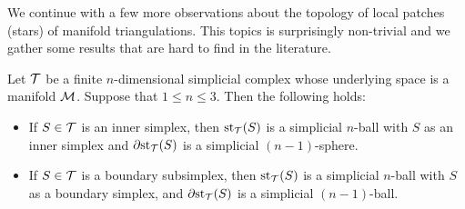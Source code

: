 \documentclass[10pt,a4paper]{article}
\begin{document}
We continue with a few more observations about the topology of local patches (stars) of manifold triangulations. This topics is surprisingly non-trivial and 
we gather some results that are hard to find in the literature. 

\begin{lemma}\label{lemma:startopology}
    Let ${\mathcal T}$ be a finite $n$-dimensional simplicial complex whose underlying space is a manifold ${\mathcal M}$.
    Suppose that $1 \leq n \leq 3$. Then the following holds:
    \begin{itemize}
        \item
        If $S \in {\mathcal T}$ is an inner simplex, 
        then $\operatorname{st}_{{\mathcal T}}(S)$ is a simplicial $n$-ball with $S$ as an inner simplex
        and ${\partial \rm st}_{{\mathcal T}}(S)$ is a simplicial $(n-1)$-sphere. 
        \item
        If $S \in {\mathcal T}$ is a boundary subsimplex, 
        then $\operatorname{st}_{{\mathcal T}}(S)$ is a simplicial $n$-ball with $S$ as a boundary simplex,
        and ${\partial \rm st}_{{\mathcal T}}(S)$ is a simplicial $(n-1)$-ball.
    \end{itemize}
\end{lemma}
\end{document}
